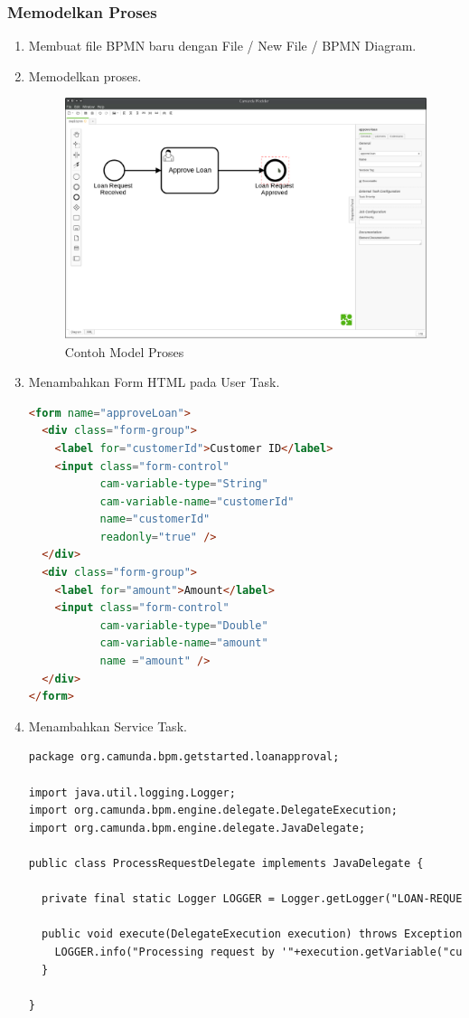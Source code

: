 \subsubsection{Memodelkan Proses}
\label{modelproses}
	\begin{enumerate}
		\item Membuat file BPMN baru dengan File / New File / BPMN Diagram.
		\item Memodelkan proses.
				\begin{figure}[H]
			\centering
			\includegraphics[scale=0.5]{Gambar/Bab-2/bpmn/bpmn}
			\caption{Contoh Model Proses} 
			\label{fig:modelproses}
		\end{figure}
		\item Menambahkan Form HTML pada User Task.
		\begin{lstlisting}[language=html,basicstyle=\tiny,caption=Contoh Task Form]
		<form name="approveLoan">
  <div class="form-group">
    <label for="customerId">Customer ID</label>
    <input class="form-control"
           cam-variable-type="String"
           cam-variable-name="customerId"
           name="customerId"
           readonly="true" />
  </div>
  <div class="form-group">
    <label for="amount">Amount</label>
    <input class="form-control"
           cam-variable-type="Double"
           cam-variable-name="amount"
           name ="amount" />
  </div>
</form>
\end{lstlisting}
		\item Menambahkan Service Task.
		\begin{lstlisting}[language=html,basicstyle=\tiny,caption=Contoh Implementasi Service Task]
		package org.camunda.bpm.getstarted.loanapproval;

import java.util.logging.Logger;
import org.camunda.bpm.engine.delegate.DelegateExecution;
import org.camunda.bpm.engine.delegate.JavaDelegate;

public class ProcessRequestDelegate implements JavaDelegate {

  private final static Logger LOGGER = Logger.getLogger("LOAN-REQUESTS");

  public void execute(DelegateExecution execution) throws Exception {
    LOGGER.info("Processing request by '"+execution.getVariable("customerId")+"'...");
  }

}
		\end{lstlisting}
	\end{enumerate}
	

